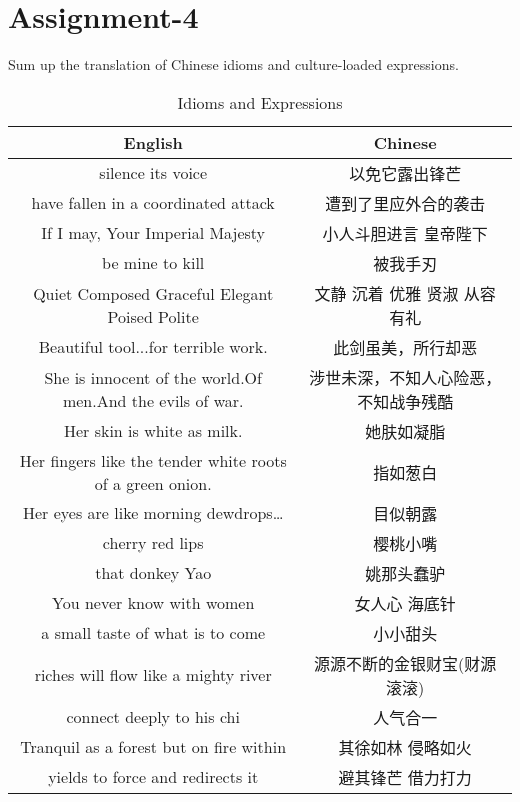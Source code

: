 \section{Assignment-4}

\begin{question}{}{}
    Sum up the translation of Chinese idioms and culture-loaded expressions.
\end{question}

\begin{table}[!ht]
    \centering
    \caption{Idioms and Expressions}
    \begin{tabular}{|c|c|}
    \hline
    \textbf{English} & \textbf{Chinese} \\ \hline
        silence its voice & 以免它露出锋芒 \\ \hline
        have fallen in a coordinated attack & 遭到了里应外合的袭击 \\ \hline
        If I may, Your Imperial Majesty & 小人斗胆进言  皇帝陛下 \\ \hline
        be mine to kill & 被我手刃 \\ \hline
        Quiet Composed Graceful Elegant Poised Polite & 文静 沉着 优雅 贤淑 从容 有礼 \\ \hline
        Beautiful tool...for terrible work. & 此剑虽美，所行却恶 \\ \hline
        She is innocent of the world.Of men.And the evils of war. & 涉世未深，不知人心险恶，不知战争残酷 \\ \hline
        Her skin is white as milk. & 她肤如凝脂\\
Her fingers like the tender white roots of a green onion. & 指如葱白\\
Her eyes are like morning dewdrops… &目似朝露 \\ \hline
        cherry red lips & 樱桃小嘴 \\ \hline
        that donkey Yao & 姚那头蠢驴 \\ \hline
        You never know with women & 女人心  海底针 \\ \hline
        a small taste of what is to come & 小小甜头 \\ \hline
        riches will flow like a mighty river & 源源不断的金银财宝(财源滚滚) \\ \hline
        connect deeply to his chi & 人气合一 \\ \hline
        Tranquil as a forest but on fire within & 其徐如林 侵略如火 \\ \hline
        yields to force and redirects it & 避其锋芒  借力打力 \\ \hline

\end{tabular}
\end{table}
